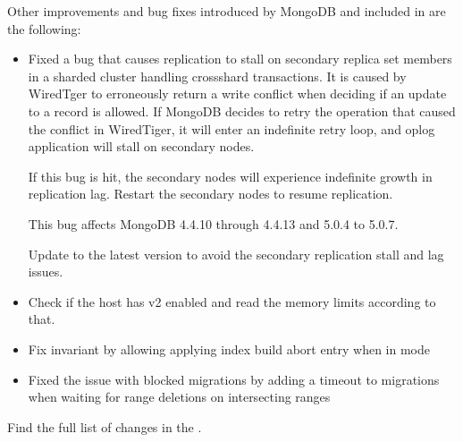 \documentclass[letterpaper,10pt,english]{sphinxmanual}
\begin{document}
\sphinxAtStartPar
Other improvements and bug fixes introduced by MongoDB and included in  are the following:
\begin{itemize}
\item {} 
\sphinxAtStartPar
{} \sphinxhyphen{} Fixed a bug that causes replication to stall on secondary replica set members in a sharded cluster handling cross\sphinxhyphen{}shard transactions. It is caused by WiredTger to erroneously return a write conflict when deciding if an update to a record is allowed. If MongoDB decides to retry the operation that caused the conflict in WiredTiger, it will enter an indefinite retry loop, and oplog application will stall on secondary nodes.

\sphinxAtStartPar
If this bug is hit, the secondary nodes will experience indefinite growth in replication lag. Restart the secondary nodes to resume replication.

\sphinxAtStartPar
This bug affects MongoDB 4.4.10 through 4.4.13 and 5.0.4 to 5.0.7.

\sphinxAtStartPar
Update to the latest version to avoid the secondary replication stall and lag issues.

\item {} 
\sphinxAtStartPar
{} \sphinxhyphen{} Check if the host has  v2 enabled and read the memory limits according to that.

\item {} 
\sphinxAtStartPar
{} \sphinxhyphen{} Fix invariant by allowing applying index build abort entry when in  mode

\item {} 
\sphinxAtStartPar
{} \sphinxhyphen{} Fixed the issue with blocked migrations by adding a timeout to migrations when waiting for range deletions on intersecting ranges

\end{itemize}

\sphinxAtStartPar
Find the full list of changes in the .
\end{document}
